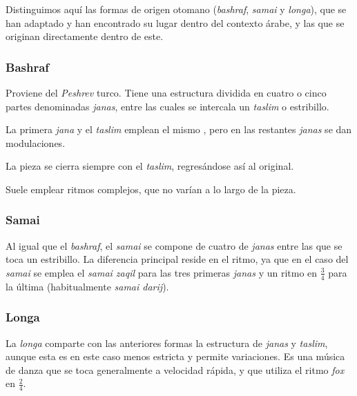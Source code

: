     Distinguimos aquí las formas de origen otomano (\emph{bashraf}, \emph{samai} y \emph{longa}), que se han adaptado y han encontrado su lugar dentro del contexto árabe, y las que se originan directamente dentro de este.

    \subsubsection{Bashraf}

        Proviene del \emph{Peshrev} turco. Tiene una estructura dividida en cuatro o cinco partes denominadas \emph{janas}, entre las cuales se intercala un \emph{taslim} o estribillo.

        La primera \emph{jana} y el \emph{taslim} emplean el mismo \maqam, pero en las restantes \emph{janas} se dan modulaciones.

        La pieza se cierra siempre con el \emph{taslim}, regresándose así al \maqam original.

        Suele emplear ritmos complejos, que no varían a lo largo de la pieza.


    \subsubsection{Samai}

        Al igual que el \emph{bashraf}, el \emph{samai} se compone de cuatro de \emph{janas} entre las que se toca un estribillo. La diferencia principal reside en el ritmo, ya que en el caso del \emph{samai} se emplea el \emph{samai zaqil} para las tres primeras \emph{janas} y un ritmo en $\frac{3}{4}$ para la última (habitualmente \emph{samai darij}).


    \subsubsection{Longa}

        La \emph{longa} comparte con las anteriores formas la estructura de \emph{janas} y \emph{taslim}, aunque esta es en este caso menos estricta y permite variaciones. Es una música de danza que se toca generalmente a velocidad rápida, y que utiliza el ritmo \emph{fox} en $\frac{2}{4}$.


